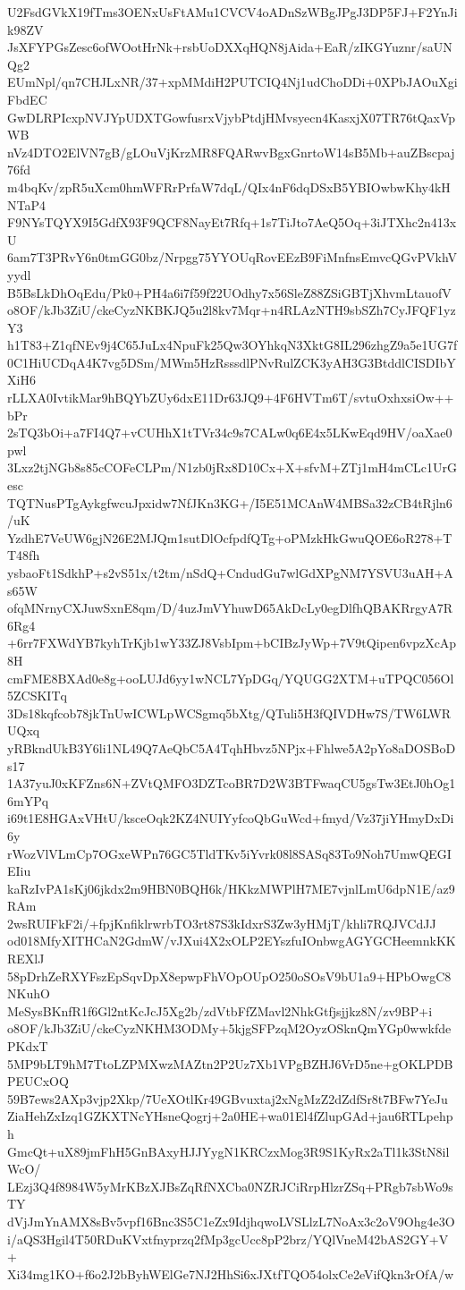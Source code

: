 U2FsdGVkX19fTms3OENxUsFtAMu1CVCV4oADnSzWBgJPgJ3DP5FJ+F2YnJik98ZV
JsXFYPGsZesc6ofWOotHrNk+rsbUoDXXqHQN8jAida+EaR/zIKGYuznr/saUNQg2
EUmNpl/qn7CHJLxNR/37+xpMMdiH2PUTCIQ4Nj1udChoDDi+0XPbJAOuXgiFbdEC
GwDLRPIcxpNVJYpUDXTGowfusrxVjybPtdjHMvsyecn4KasxjX07TR76tQaxVpWB
nVz4DTO2ElVN7gB/gLOuVjKrzMR8FQARwvBgxGnrtoW14sB5Mb+auZBscpaj76fd
m4bqKv/zpR5uXcm0hmWFRrPrfaW7dqL/QIx4nF6dqDSxB5YBIOwbwKhy4kHNTaP4
F9NYsTQYX9I5GdfX93F9QCF8NayEt7Rfq+1s7TiJto7AeQ5Oq+3iJTXhc2n413xU
6am7T3PRvY6n0tmGG0bz/Nrpgg75YYOUqRovEEzB9FiMnfnsEmvcQGvPVkhVyydl
B5BsLkDhOqEdu/Pk0+PH4a6i7f59f22UOdhy7x56SleZ88ZSiGBTjXhvmLtauofV
o8OF/kJb3ZiU/ckeCyzNKBKJQ5u2l8kv7Mqr+n4RLAzNTH9sbSZh7CyJFQF1yzY3
h1T83+Z1qfNEv9j4C65JuLx4NpuFk25Qw3OYhkqN3XktG8IL296zhgZ9a5e1UG7f
0C1HiUCDqA4K7vg5DSm/MWm5HzRsssdlPNvRulZCK3yAH3G3BtddlCISDIbYXiH6
rLLXA0IvtikMar9hBQYbZUy6dxE11Dr63JQ9+4F6HVTm6T/svtuOxhxsiOw++bPr
2sTQ3bOi+a7FI4Q7+vCUHhX1tTVr34c9s7CALw0q6E4x5LKwEqd9HV/oaXae0pwl
3Lxz2tjNGb8s85cCOFeCLPm/N1zb0jRx8D10Cx+X+sfvM+ZTj1mH4mCLc1UrGesc
TQTNusPTgAykgfwcuJpxidw7NfJKn3KG+/I5E51MCAnW4MBSa32zCB4tRjln6/uK
YzdhE7VeUW6gjN26E2MJQm1sutDlOcfpdfQTg+oPMzkHkGwuQOE6oR278+TT48fh
ysbaoFt1SdkhP+s2vS51x/t2tm/nSdQ+CndudGu7wlGdXPgNM7YSVU3uAH+As65W
ofqMNrnyCXJuwSxnE8qm/D/4uzJmVYhuwD65AkDcLy0egDlfhQBAKRrgyA7R6Rg4
+6rr7FXWdYB7kyhTrKjb1wY33ZJ8VsbIpm+bCIBzJyWp+7V9tQipen6vpzXcAp8H
cmFME8BXAd0e8g+ooLUJd6yy1wNCL7YpDGq/YQUGG2XTM+uTPQC056Ol5ZCSKITq
3Ds18kqfcob78jkTnUwICWLpWCSgmq5bXtg/QTuli5H3fQIVDHw7S/TW6LWRUQxq
yRBkndUkB3Y6li1NL49Q7AeQbC5A4TqhHbvz5NPjx+Fhlwe5A2pYo8aDOSBoDs17
1A37yuJ0xKFZns6N+ZVtQMFO3DZTcoBR7D2W3BTFwaqCU5gsTw3EtJ0hOg16mYPq
i69t1E8HGAxVHtU/ksceOqk2KZ4NUIYyfcoQbGuWcd+fmyd/Vz37jiYHmyDxDi6y
rWozVlVLmCp7OGxeWPn76GC5TldTKv5iYvrk08l8SASq83To9Noh7UmwQEGIEIiu
kaRzIvPA1sKj06jkdx2m9HBN0BQH6k/HKkzMWPlH7ME7vjnlLmU6dpN1E/az9RAm
2wsRUIFkF2i/+fpjKnfiklrwrbTO3rt87S3kIdxrS3Zw3yHMjT/khli7RQJVCdJJ
od018MfyXITHCaN2GdmW/vJXui4X2xOLP2EYszfuIOnbwgAGYGCHeemnkKKREXlJ
58pDrhZeRXYFszEpSqvDpX8epwpFhVOpOUpO250oSOsV9bU1a9+HPbOwgC8NKuhO
MeSysBKnfR1f6Gl2ntKcJcJ5Xg2b/zdVtbFfZMavl2NhkGtfjsjjkz8N/zv9BP+i
o8OF/kJb3ZiU/ckeCyzNKHM3ODMy+5kjgSFPzqM2OyzOSknQmYGp0wwkfdePKdxT
5MP9bLT9hM7TtoLZPMXwzMAZtn2P2Uz7Xb1VPgBZHJ6VrD5ne+gOKLPDBPEUCxOQ
59B7ews2AXp3vjp2Xkp/7UeXOtlKr49GBvuxtaj2xNgMzZ2dZdfSr8t7BFw7YeJu
ZiaHehZxIzq1GZKXTNcYHsneQogrj+2a0HE+wa01El4fZlupGAd+jau6RTLpehph
GmcQt+uX89jmFhH5GnBAxyHJJYygN1KRCzxMog3R9S1KyRx2aTl1k3StN8ilWcO/
LEzj3Q4f8984W5yMrKBzXJBsZqRfNXCba0NZRJCiRrpHlzrZSq+PRgb7sbWo9sTY
dVjJmYnAMX8sBv5vpf16Bnc3S5C1eZx9IdjhqwoLVSLlzL7NoAx3c2oV9Ohg4e3O
i/aQS3Hgil4T50RDuKVxtfnyprzq2fMp3gcUcc8pP2brz/YQlVneM42bAS2GY+V+
Xi34mg1KO+f6o2J2bByhWElGe7NJ2HhSi6xJXtfTQO54olxCe2eVifQkn3rOfA/w
